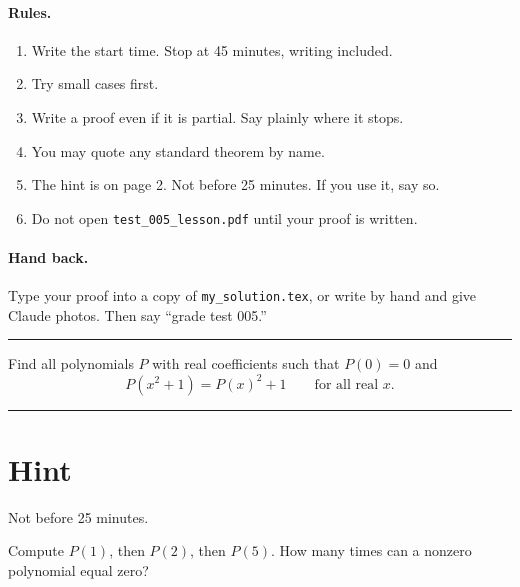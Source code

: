 \documentclass[11pt]{article}
\begin{document}

\paragraph{Rules.}
\begin{enumerate}
  \item Write the start time. Stop at 45 minutes, writing included.
  \item Try small cases first.
  \item Write a proof even if it is partial. Say plainly where it stops.
  \item You may quote any standard theorem by name.
  \item The hint is on page 2. Not before 25 minutes. If you use it, say so.
  \item Do not open \texttt{test\_005\_lesson.pdf} until your proof is written.
\end{enumerate}

\paragraph{Hand back.} Type your proof into a copy of \texttt{my\_solution.tex}, or write by hand and give Claude photos. Then say ``grade test 005.''

\vspace{10pt}\hrule\vspace{10pt}

\begin{problem}
Find all polynomials $P$ with real coefficients such that $P(0) = 0$ and
\[ P(x^2 + 1) = P(x)^2 + 1 \qquad \text{for all real } x. \]
\end{problem}

\vspace{10pt}\hrule

\clearpage
\section*{Hint}
Not before 25 minutes.

\spoilerspace
\begin{hint}
Compute $P(1)$, then $P(2)$, then $P(5)$. How many times can a nonzero polynomial equal zero?
\end{hint}
\end{document}
